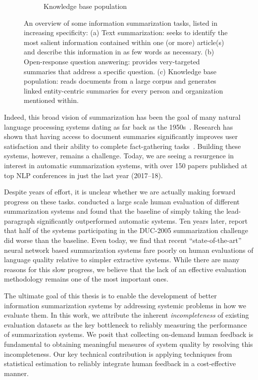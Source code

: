 \begin{figure}
\begin{subfigure}[b]{.32\textwidth}
    \caption{Knowledge base population}
  \end{subfigure}
  \hfill

  \caption[Overview of some information summarization tasks]{\label{fig:intro:overview} An overview of some information summarization tasks, listed in increasing specificity:
  (a) Text summarization: seeks to identify the most salient information contained within one (or more) article(s) and describe this information in as few words as necessary.
  (b) Open-response question answering: provides very-targeted summaries that address a specific question.
  (c) Knowledge base population: reads documents from a large corpus and generates linked entity-centric summaries for every person and organization mentioned within.
  }
\end{figure}

Indeed, this broad vision of summarization has been the goal of many natural language processing systems dating as far back as the 1950s~\citep{luhn1958automatic}.
Research has shown that having access to document summaries significantly improves user satisfaction and their ability to complete fact-gathering tasks~\citep{mani1999tipster, mckeown2005summaries}. 
Building these systems, however, remains a challenge.
Today, we are seeing a resurgence in interest in automatic summarization systems, with over 150 papers published at top NLP conferences in just the last year (2017--18).

Despite years of effort, it is unclear whether we are actually making forward progress on these tasks.
\citet{brandow1995automatic} conducted a large scale human evaluation of different summarization systems and found that the baseline of simply taking the lead-paragraph significantly outperformed automatic systems. 
Ten years later, \citet{passonneau2005applying} report that half of the systems participating in the DUC-2005 summarization challenge did worse than the baseline.
Even today, we find that recent ``state-of-the-art'' neural network based summarization systems fare poorly on human evaluations of language quality relative to simpler extractive systems.
While there are many reasons for this slow progress, we believe that the lack of an effective evaluation methodology remains one of the most important ones.

The ultimate goal of this thesis is to enable the development of better information summarization systems by addressing systemic problems in how we evaluate them.
In this work, we attribute the inherent \textit{incompleteness} of existing evaluation datasets as the key bottleneck to reliably measuring the performance of summarization systems.
We posit that collecting on-demand human feedback is fundamental to obtaining meaningful measures of system quality by resolving this incompleteness.
Our key technical contribution is applying techniques from statistical estimation to reliably integrate human feedback in a cost-effective manner.

